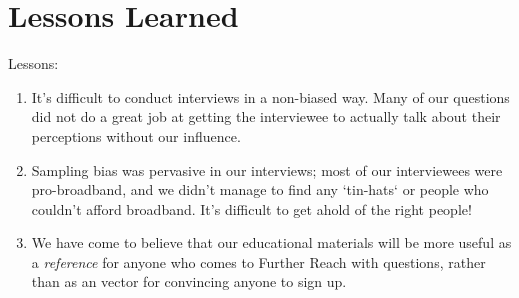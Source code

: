 \section{Lessons Learned}
\label{sec:lessons}

Lessons:
\begin{enumerate}
\item It's difficult to conduct interviews in a non-biased way. Many of our
questions did not do a great job at getting the interviewee to actually talk
about their perceptions without our influence.
\item Sampling bias was pervasive in our interviews; most of our
interviewees were pro-broadband, and we didn't manage to find any `tin-hats`
or people who couldn't afford broadband. It's difficult to
get ahold of the right people!
\item We have come to believe that our educational materials will be more
useful as a {\em reference} for anyone who comes to Further Reach with
questions, rather than as an vector for convincing anyone to sign up.
\end{enumerate}



